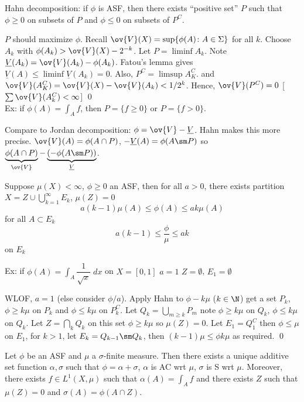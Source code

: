 Hahn decomposition: if $\phi$ is ASF, then there exists ``positive set'' $P$ such that $\phi \geq 0$ on subsets of $P$ and $\phi \leq 0$ on subsets of $P^C$.

\pf $P$ should maximize $\phi$. Recall $\ov{V}(X)= \sup \{ \phi(A) \colon A \in \Sigma\}$ for all $k$. Choose $A_k$ with $\phi(A_k) > \ov{V}(X) - 2^{-k}$. Let $P= \liminf A_k$. Note $\underline{V}(A_k)= \ov{V}(A_k) - \phi(A_k)$. Fatou's lemma gives $\underline{V}(A) \leq \liminf \underline{V}(A_k)= 0$. Also, $P^C= \limsup A_K^C$. and $\ov{V}(A_K^C)= \ov{V}(X) - \ov{V}(A_k)< 1/2^k$. Hence, $\ov{V}(P^C)=0$ [$\sum \ov{V}(A_k^C)<\infty$] \qed \\


Ex: if $\phi(A)= \int_A f$, then $P= \{ f \geq 0 \}$ or $P=\{ f>0 \}$. 

Compare to Jordan decomposition: $\phi= \ov{V} - \underline{V}$. Hahn makes this more precise. $\ov{V}(A)= \phi(A \cap P)$, $-\underline{V}(A)= \phi(A \sm P)$ so $\underbrace{\phi(A \cap P)}_{\ov{V}} - \underbrace{(- \phi(A \sm P))}_{\underline{V}}$.


\begin{lem}
Suppose $\mu(X)< \infty$, $\phi \geq 0$ an ASF, then for all $a>0$, there exists partition $X= Z \cup \bigcup_{k=1}^\infty E_k$, $\mu(Z)=0$
	\[
	a(k-1) \mu(A) \leq \phi(A) \leq a k \mu(A)
	\]
for all $A \subset E_k$
	\[
	a(k-1) \leq \dfrac{\phi}{\mu} \leq ak
	\]
on $E_k$
\end{lem}


Ex: if $\phi(A) = \int_A \dfrac{1}{\sqrt{x}} \; dx$ on $X=[0,1]$ $a=1$ $Z= \emptyset$, $E_1= \emptyset$


\pf WLOF, $a=1$ (else consider $\phi/a$). Apply Hahn to $\phi - k \mu$ ($k \in \N$) get a set $P_k$, $\phi \geq k \mu$ on $P_k$ and $\phi \leq k \mu$ on $P_k^C$. Let $Q_k= \bigcup_{m \geq k} P_m$ note $\phi \geq k \mu$ on $Q_k$, $\phi \leq k \mu$ on $Q_k$. Let $Z= \bigcap_k Q_k$ on this set $\phi \geq k \mu$ so $\mu(Z)=0$. Let $E_1= Q_1^C$ then $\phi \leq \mu$ on $E_1$, for $k>1$, let $E_k = Q_{k-1} \sm Q_k$, then $(k-1) \mu \leq \phi k \mu$ as required. \qed \\





\begin{thm}
Let $\phi$ be an ASF and $\mu$ a $\sigma$-finite measure. Then there exists a unique additive set function $\alpha,\sigma$ such that $\phi = \alpha + \sigma$, $\alpha$ is AC wrt $\mu$, $\sigma$ is S wrt $\mu$. Moreover, there exists $f \in L^1(X,\mu)$ such that $\alpha(A)= \int_A f$ and there exists $Z$ such that $\mu(Z)=0$ and $\sigma(A)= \phi(A \cap Z)$.
\end{thm}

